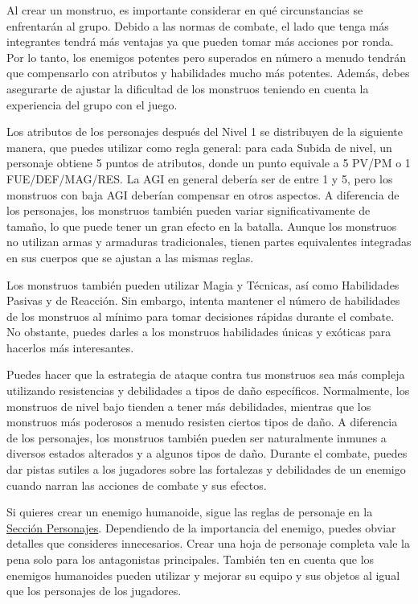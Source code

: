 \begin{description}[leftmargin=*]

\item[\color{accent} Contexto:] Al crear un monstruo, es importante considerar en qué circunstancias se enfrentarán al grupo. Debido a las normas de combate, el lado que tenga más integrantes tendrá más ventajas ya que pueden tomar más acciones por ronda. Por lo tanto, los enemigos potentes pero superados en número a menudo tendrán que compensarlo con atributos y habilidades mucho más potentes. Además, debes asegurarte de ajustar la dificultad de los monstruos teniendo en cuenta la experiencia del grupo con el juego. \item[\color{accent} Atributos:] Los atributos de los personajes después del Nivel 1 se distribuyen de la siguiente manera, que puedes utilizar como regla general: para cada Subida de nivel, un personaje obtiene 5 puntos de atributos, donde un punto equivale a 5 PV/PM o 1 FUE/DEF/MAG/RES.
\pagebreak
La AGI en general debería ser de entre 1 y 5, pero los monstruos con baja AGI deberían compensar en otros aspectos. A diferencia de los personajes, los monstruos también pueden variar significativamente de tamaño, lo que puede tener un gran efecto en la batalla. Aunque los monstruos no utilizan armas y armaduras tradicionales, tienen partes equivalentes integradas en sus cuerpos que se ajustan a las mismas reglas. \item[\color{accent} Habilidades:] Los monstruos también pueden utilizar Magia y Técnicas, así como Habilidades Pasivas y de Reacción. Sin embargo, intenta mantener el número de habilidades de los monstruos al mínimo para tomar decisiones rápidas durante el combate. No obstante, puedes darles a los monstruos habilidades únicas y exóticas para hacerlos más interesantes. \item[\color{accent} Resistencias y Debilidades:] Puedes hacer que la estrategia de ataque contra tus monstruos sea más compleja utilizando resistencias y debilidades a tipos de daño específicos. Normalmente, los monstruos de nivel bajo tienden a tener más debilidades, mientras que los monstruos más poderosos a menudo resisten ciertos tipos de daño. A diferencia de los personajes, los monstruos también pueden ser naturalmente inmunes a diversos estados alterados y a algunos tipos de daño. Durante el combate, puedes dar pistas sutiles a los jugadores sobre las fortalezas y debilidades de un enemigo cuando narran las acciones de combate y sus efectos. \item[\color{accent} Humanoides:] Si quieres crear un enemigo humanoide, sigue las reglas de personaje en la \hyperlink{char}{Sección Personajes}. Dependiendo de la importancia del enemigo, puedes obviar detalles que consideres innecesarios. Crear una hoja de personaje completa vale la pena solo para los antagonistas principales. También ten en cuenta que los enemigos humanoides pueden utilizar y mejorar su equipo y sus objetos al igual que los personajes de los jugadores. 
	
\end{description}

